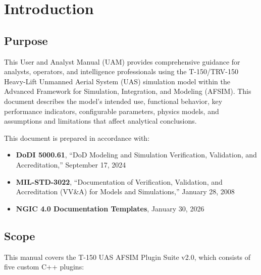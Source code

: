 

\section{\unclass Introduction}\label{sec:Introduction}

\subsection{\unclass Purpose}\label{sec:Purpose}

\unclass This User and Analyst Manual (UAM) provides comprehensive guidance for analysts, operators, and intelligence professionals using the T-150/TRV-150 Heavy-Lift Unmanned Aerial System (UAS) simulation model within the Advanced Framework for Simulation, Integration, and Modeling (AFSIM). This document describes the model's intended use, functional behavior, key performance indicators, configurable parameters, physics models, and assumptions and limitations that affect analytical conclusions.

\unclass This document is prepared in accordance with:

\begin{itemize}
	\item \unclass \textbf{DoDI 5000.61}, ``DoD Modeling and Simulation Verification, Validation, and Accreditation,'' September 17, 2024 \cite{dodi500061}
	\item \unclass \textbf{MIL-STD-3022}, ``Documentation of Verification, Validation, and Accreditation (VV\&A) for Models and Simulations,'' January 28, 2008 \cite{milstd3022}
	\item \unclass \textbf{NGIC 4.0 Documentation Templates}, January 30, 2026
\end{itemize}

\subsection{\unclass Scope}\label{sec:Scope}

\unclass This manual covers the T-150 UAS AFSIM Plugin Suite v2.0, which consists of five custom C++ plugins:

